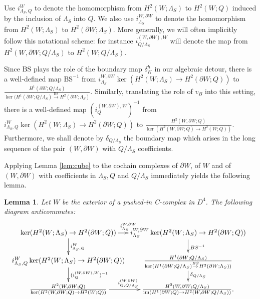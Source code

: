 \documentclass[11pt,a4paper]{amsart}
\newtheorem{lemma}[theorem]{Lemma}
\theoremstyle{definition}
\newcommand{\im}{\operatorname{im}}
\begin{document}
\medskip
Use $i^W_{\Lambda_S , Q}$ to denote the homomorphism from $H^2(W;\Lambda_S)$ to $H^2(W;Q)$ induced by the inclusion of $\Lambda_S$ into $Q$. We also use $i_{\Lambda_S}^{W,\partial W}$ to denote the homomorphism from $H^2(W;\Lambda_S)$ to $H^2(\partial W;\Lambda_S)$. More generally, we will often implicitly follow this notational scheme: for instance $i_{Q/\Lambda_S}^{(W,\partial W),W}$ will denote the map from $H^2(W,\partial W;Q/ \Lambda_S )$ to $H^2(W;Q/ \Lambda_S)$.

Since $\text{BS}$ plays the role of the boundary map $\delta_K^h$ in our algebraic detour, there is a well-defined map $\text{BS}^{-1}$ from $i_{\Lambda_S}^{W,\partial W}\ker(H^2(W;\Lambda_S) \to H^2(\partial W;Q))$ to $\frac{H^1(\partial W;Q/ \Lambda_S)}{\ker(H^1(\partial W;Q/ \Lambda_S) \stackrel{\text{BS}}{\to} H^2(\partial W;\Lambda_S)}$. Similarly, translating the role of $v_B$ into this setting, there is a well-defined map $(i^{(W,\partial W),W}_Q)^{-1}$ from $i^W_{\Lambda_S,Q} \ker(H^2(W;\Lambda_S) \to H^2(\partial W;Q))$ to $\frac{H^2(W,\partial W;Q)}{\ker(H^2(W,\partial W;Q) \to H^2(W;Q))}$. Furthermore, we shall denote by $\delta_{Q/\Lambda_S}$ the boundary map which arises in the long sequence of the pair $(W,\partial W)$ with $Q/\Lambda_S$ coefficients. 

Applying Lemma \ref{lem:cube} to the cochain complexes of $\partial W$, of $W$ and of $(W,\partial W)$ with coefficients in $\Lambda_S, Q$ and $Q / \Lambda_S$ immediately yields the following lemma.

\begin{lemma}
\label{lem:BigDiagram}
Let $W$ be the exterior of a pushed-in C-complex in $D^4$. 
The following diagram anticommutes:
$$ \xymatrix@R0.6cm@C-1cm{
\ker(H^2(W;\Lambda_S) \to H^2(\partial W;Q)) \ar[rrrrr]^{i_{\Lambda_S}^{W,\partial W}} \ar[d]^{i^W_{\Lambda_S,Q}}
 &&&&& i_{\Lambda_S}^{W,\partial W} \ker(H^2(W;\Lambda_S) \to H^2(\partial W;Q)) \ar[d]^{BS^{-1}} && \\
i^W_{\Lambda_S,Q} \ker(H^2(W;\Lambda_S) \to H^2(\partial W;Q)) \ar[d]^{(i_Q^{(W,\partial W),W})^{-1}}
&&&&& \frac{H^1(\partial W;Q/\Lambda_S)}{\ker(H^1(\partial W;Q/\Lambda_S) \stackrel{BS}{\to} H^2(\partial W;\Lambda_S)) }  \ar[d]^{\delta_{Q/\Lambda_S}} &&   \\ 
\frac{H^2(W,\partial W;Q)}{\ker(H^2(W,\partial W;Q) \to H^2(W;Q))}  \ar[rrrrr]^{i^{(W,\partial W)}_{Q,Q/ \Lambda_S}}
 &&&&& \frac{H^2(W,\partial W;Q/\Lambda_S)}{\im(H^1(\partial W;Q) \to H^2(W,\partial W;Q/\Lambda_S))}.  &&    
}$$
\end{lemma}
\end{document}
